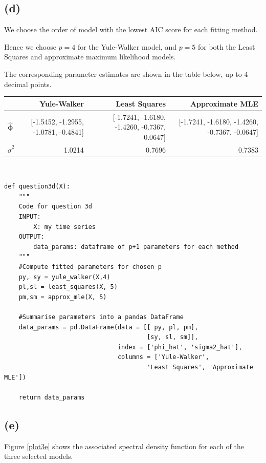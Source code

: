 \documentclass[a4paper,10pt]{article}
\theoremstyle{mytheor}
\begin{document}
\subsection*{(d)}
We choose the order of model with the lowest AIC score for each fitting method.

Hence we choose $p = 4$ for the Yule-Walker model, and $p=5$ for both the Least Squares and approximate maximum likelihood models.

The corresponding parameter estimates are shown in the table below, up to 4 decimal points. \\

\begin{tabular}{lrrr}
\toprule
{} &Yule-Walker & Least Squares & Approximate MLE \\
\midrule
$\hat{\mathbf{\phi}}$    &  \parbox{3cm}{[-1.5452, -1.2955, -1.0781, -0.4841]} &  \parbox{3.75cm}{[-1.7241, -1.6180, -1.4260, -0.7367, -0.0647]} &  \parbox{3.75cm}{[-1.7241, -1.6180, -1.4260, -0.7367, -0.0647]} \\
$\hat{\sigma}^2$ &  1.0214 &  0.7696 &  0.7383 \\
\bottomrule
\end{tabular} \\

\begin{lstlisting}
def question3d(X):
    """
    Code for question 3d
    INPUT: 
        X: my time series
    OUTPUT: 
        data_params: dataframe of p+1 parameters for each method
    """
    #Compute fitted parameters for chosen p
    py, sy = yule_walker(X,4)
    pl,sl = least_squares(X, 5)
    pm,sm = approx_mle(X, 5)
    
    #Summarise parameters into a pandas DataFrame
    data_params = pd.DataFrame(data = [[ py, pl, pm],
                                       [sy, sl, sm]],
                               index = ['phi_hat', 'sigma2_hat'],
                               columns = ['Yule-Walker', 
                                       'Least Squares', 'Approximate MLE'])
   
    return data_params
\end{lstlisting}

\subsection*{(e)}

Figure \ref{plot3e} shows the associated spectral density function for each of the three selected models.
\end{document}
